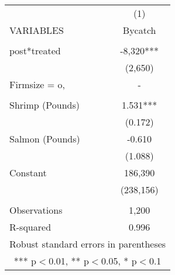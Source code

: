 \begin{tabular}{lc} \hline
 & (1) \\
VARIABLES & Bycatch \\ \hline
 &  \\
post*treated & -8,320*** \\
 & (2,650) \\
Firmsize = o, & - \\
 &  \\
Shrimp (Pounds) & 1.531*** \\
 & (0.172) \\
Salmon (Pounds) & -0.610 \\
 & (1.088) \\
Constant & 186,390 \\
 & (238,156) \\
 &  \\
Observations & 1,200 \\
 R-squared & 0.996 \\ \hline
\multicolumn{2}{c}{ Robust standard errors in parentheses} \\
\multicolumn{2}{c}{ *** p$<$0.01, ** p$<$0.05, * p$<$0.1} \\
\end{tabular}
